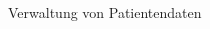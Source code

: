 \documentclass[final,hyperref={pdfpagelabels=false}]{beamer}
\begin{document}
\begin{frame}[t]
\begin{columns}[t]
\begin{column}{0.465\textwidth}
\begin{block}{Verwaltung von Patientendaten}
\begin{figure}
    \end{figure}
%
% 
    
\end{block}


\end{column}

\begin{column}{.025\textwidth}\end{column} %

\end{columns} %


\begin{columns}[t] %

\begin{column}{.025\textwidth}\end{column} %

\begin{column}{.465\textwidth} %


\end{column}
\end{columns}
\end{frame}
\end{document}
